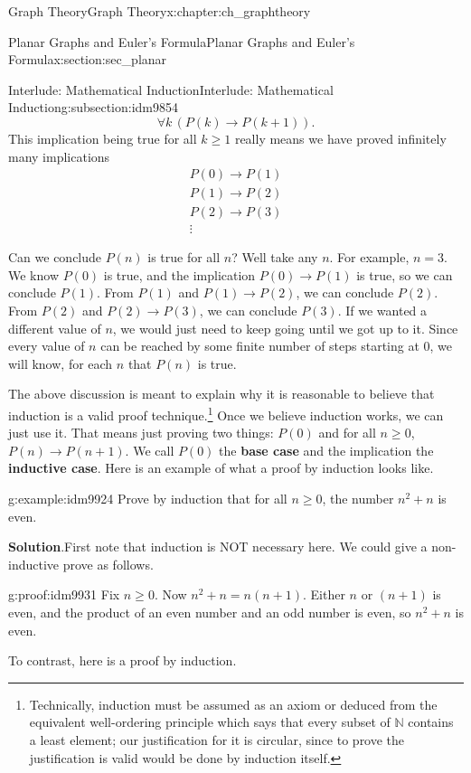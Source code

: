 \documentclass[oneside,10pt,]{book}
\newcommand{\terminology}[1]{\textbf{#1}}
\numberwithin{equation}{chapter}
\def\N{\mathbb N}
\def\imp{\rightarrow}
\begin{document}
\begin{chapterptx}{Graph Theory}{}{Graph Theory}{}{}{x:chapter:ch_graphtheory}
\begin{sectionptx}{Planar Graphs and Euler's Formula}{}{Planar Graphs and Euler's Formula}{}{}{x:section:sec_planar}
\begin{subsectionptx}{Interlude: Mathematical Induction}{}{Interlude: Mathematical Induction}{}{}{g:subsection:idm9854}
\begin{equation*}
\forall k \,(P(k) \imp P(k+1)).
\end{equation*}
This implication being true for all \(k \ge 1\) really means we have proved infinitely many implications%
\begin{gather*}
P(0) \imp P(1)\\
P(1) \imp P(2)\\
P(2) \imp P(3)\\
\vdots
\end{gather*}
%
\par
Can we conclude \(P(n)\) is true for all \(n\)?  Well take any \(n\).  For example, \(n = 3\).  We know \(P(0)\) is true, and the implication \(P(0) \imp P(1)\) is true, so we can conclude \(P(1)\).  From \(P(1)\) and \(P(1) \imp P(2)\), we can conclude \(P(2)\).  From \(P(2)\) and \(P(2) \imp P(3)\), we can conclude \(P(3)\).  If we wanted a different value of \(n\), we would just need to keep going until we got up to it.  Since every value of \(n\) can be reached by some finite number of steps starting at 0, we will know, for each \(n\) that \(P(n)\) is true.%
\par
The above discussion is meant to explain why it is reasonable to believe that induction is a valid proof technique.\footnote{Technically, induction must be assumed as an axiom or deduced from the equivalent well-ordering principle which says that every subset of \(\N\) contains a least element; our justification for it is circular, since to prove the justification is valid would be done by induction itself.\label{g:fn:idm9916}}  Once we believe induction works, we can just use it.  That means just proving two things: \(P(0)\) and for all \(n \ge 0\), \(P(n) \imp P(n+1)\).  We call \(P(0)\) the \terminology{base case} and the implication the \terminology{inductive case}.  Here is an example of what a proof by induction looks like.%
\begin{example}{}{g:example:idm9924}%
Prove by induction that for all \(n \ge 0\), the number \(n^2 + n\) is even.%
\par\smallskip%
\noindent\textbf{Solution}.\hypertarget{g:solution:idm9929}{}\quad{}First note that induction is NOT necessary here.  We could give a non-inductive prove as follows.%
\begin{proofptx}{}{g:proof:idm9931}
Fix \(n \ge 0\).  Now \(n^2 + n = n(n+1)\).  Either \(n\) or \((n+1)\) is even, and the product of an even number and an odd number is even, so \(n^2 + n\) is even.%
\end{proofptx}
To contrast, here is a proof by induction.%

\end{example}
\end{subsectionptx}
\end{sectionptx}
\end{chapterptx}
\end{document}
